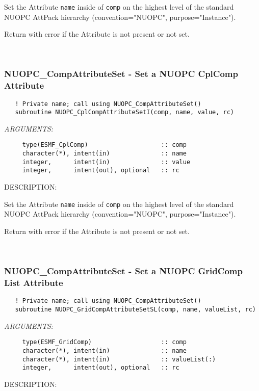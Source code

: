      Set the Attribute {\tt name} inside of {\tt comp} on the highest level
     of the standard NUOPC AttPack hierarchy (convention="NUOPC", 
     purpose="Instance").
  
     Return with error if the Attribute is not present or not set. 
 
\mbox{}\hrulefill\ 
 
\subsubsection [NUOPC\_CompAttributeSet] {NUOPC\_CompAttributeSet - Set a NUOPC CplComp Attribute}


\begin{verbatim}   ! Private name; call using NUOPC_CompAttributeSet() 
   subroutine NUOPC_CplCompAttributeSetI(comp, name, value, rc)\end{verbatim}{\em ARGUMENTS:}
\begin{verbatim}     type(ESMF_CplComp)                    :: comp
     character(*), intent(in)              :: name
     integer,      intent(in)              :: value
     integer,      intent(out), optional   :: rc\end{verbatim}
{\sf DESCRIPTION:\\ }


     Set the Attribute {\tt name} inside of {\tt comp} on the highest level
     of the standard NUOPC AttPack hierarchy (convention="NUOPC", 
     purpose="Instance").
  
     Return with error if the Attribute is not present or not set. 
 
\mbox{}\hrulefill\ 
 
\subsubsection [NUOPC\_CompAttributeSet] {NUOPC\_CompAttributeSet - Set a NUOPC GridComp List Attribute}


\begin{verbatim}   ! Private name; call using NUOPC_CompAttributeSet() 
   subroutine NUOPC_GridCompAttributeSetSL(comp, name, valueList, rc)\end{verbatim}{\em ARGUMENTS:}
\begin{verbatim}     type(ESMF_GridComp)                   :: comp
     character(*), intent(in)              :: name
     character(*), intent(in)              :: valueList(:)
     integer,      intent(out), optional   :: rc\end{verbatim}
{\sf DESCRIPTION:\\ }


